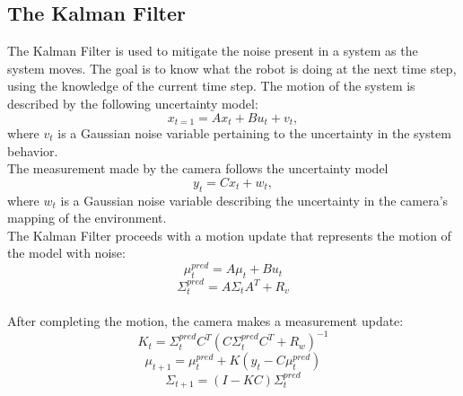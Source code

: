 \subsection*{The Kalman Filter}
The Kalman Filter is used to mitigate the noise present in a system as the system moves.  The goal is to know what the robot is doing at the next time step, using the knowledge of the current time step.  The motion of the system is described by the following uncertainty model:
\begin{equation}
    x_{t=1}=Ax_t+Bu_t+v_t,
\end{equation}
where $v_t$ is a Gaussian noise variable pertaining to the uncertainty in the system behavior.
\\
The measurement made by the camera follows the uncertainty model
\begin{equation}
    y_t=Cx_t+w_t,
\end{equation}
where $w_t$ is a Gaussian noise variable describing the uncertainty in the camera's mapping of the environment.
\\
The Kalman Filter proceeds with a motion update that represents the motion of the model with noise:
\begin{equation}
    \mu_t^{pred}=A\mu_t+Bu_t
\end{equation}
\begin{equation}
    \Sigma_t^{pred}=A\Sigma_tA^T+R_v
\end{equation}
\\
After completing the motion, the camera makes a measurement update:
\begin{equation}
    K_t=\Sigma_t^{pred}C^{T}(C\Sigma_t^{pred}C^{T}+R_w)^{-1}
\end{equation}
\begin{equation}
    \mu_{t+1}=\mu_t^{pred}+K(y_t-C\mu_t^{pred})
\end{equation}
\begin{equation}
    \Sigma_{t+1}=(I-KC)\Sigma_t^{pred}
\end{equation}
